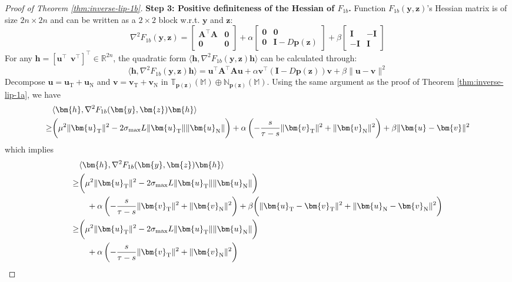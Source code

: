 \documentclass{amsart} %
\def\vzero{{\bm{0}}}
\def\vh{{\bm{h}}}
\def\vp{{\bm{p}}}
\def\vu{{\bm{u}}}
\def\vv{{\bm{v}}}
\def\vy{{\bm{y}}}
\def\vz{{\bm{z}}}
\def\mA{{\bm{A}}}
\def\mI{{\bm{I}}}
\def\sM{{\mathbb{M}}}
\def\sN{{\mathbb{N}}}
\def\sR{{\mathbb{R}}}
\def\sT{{\mathbb{T}}}
\theoremstyle{definition}
\theoremstyle{remark}
\begin{document}
\begin{proof}[Proof of Theorem \ref{thm:inverse-lip-1b}]
\textbf{Step 3: Positive definiteness of the Hessian of $F_{1b}$.} Function $F_{1b}(\vy,\vz)$'s Hessian matrix is of size $2n \times 2n$ and can be written as a $2\times 2$ block w.r.t. $\vy$ and $\vz$:
\[ \nabla^2F_{1b}(\vy,\vz) = 
\begin{bmatrix}
\mA^\top \mA & \vzero \\ 
\vzero & \vzero
\end{bmatrix} + 
\alpha \begin{bmatrix}
\vzero & \vzero \\ 
\vzero & \mI - D\vp(\vz)
\end{bmatrix} + 
\beta \begin{bmatrix}
\mI & -\mI \\ 
-\mI & \mI
\end{bmatrix}
\]
For any $\vh = [\vu^\top~~ \vv^\top]^\top \in \sR^{2n}$, the quadratic form $\langle \vh, \nabla^2F_{1b}(\vy,\vz) \vh\rangle$ can be calculated through:
\[
\langle \vh, \nabla^2F_{1b}(\vy,\vz) \vh\rangle
= \vu^\top\mA^\top \mA\vu + \alpha \vv^\top(\mI - D\vp(\vz))\vv + \beta \|\vu-\vv\|^2
\]
Decompose $\vu = \vu_{\mathrm{T}} + \vu_{\mathrm{N}}$ and $\vv = \vv_{\mathrm{T}} + \vv_{\mathrm{N}}$ in $\sT_{\vp(\vz)}(\sM) \oplus \sN_{\vp(\vz)}(\sM)$. Using the same argument as the proof of Theorem \ref{thm:inverse-lip-1a}, we have
\begin{align*}
& \langle \vh, \nabla^2F_{1b}(\vy,\vz) \vh\rangle \\
\geq & \bigg( \mu^2 \|\vu_{\mathrm{T}} \|^2 - 2 \sigma_{\textup{max}} L\|\vu_{\mathrm{T}}\|\|\vu_{\mathrm{N}}\| \bigg) 
+ \alpha \left(- \frac{s}{\tau - s} \|\vv_{\mathrm{T}} \|^2 + \|\vv_{\mathrm{N}} \|^2  \right)
+ \beta \|\vu-\vv\|^2
\end{align*}
which implies 
\begin{align*}
& \langle \vh, \nabla^2F_{1b}(\vy,\vz) \vh\rangle  \\
\geq & \bigg( \mu^2 \|\vu_{\mathrm{T}} \|^2 - 2 \sigma_{\textup{max}} L\|\vu_{\mathrm{T}}\|\|\vu_{\mathrm{N}}\| \bigg) \\
& \quad + \alpha \left(- \frac{s}{\tau - s} \|\vv_{\mathrm{T}} \|^2 + \|\vv_{\mathrm{N}} \|^2  \right)
+ \beta \bigg( \|\vu_{\mathrm{T}}-\vv_{\mathrm{T}}\|^2 + \|\vu_{\mathrm{N}}-\vv_{\mathrm{N}}\|^2 \bigg) \\
\geq & \bigg( \mu^2 \|\vu_{\mathrm{T}} \|^2 - 2 \sigma_{\textup{max}} L\|\vu_{\mathrm{T}}\|\|\vu_{\mathrm{N}}\| \bigg) \\
& \quad + \alpha \left(- \frac{s}{\tau - s} \|\vv_{\mathrm{T}} \|^2 + \|\vv_{\mathrm{N}} \|^2  \right)

\end{align*}
\end{proof}
\end{document}
